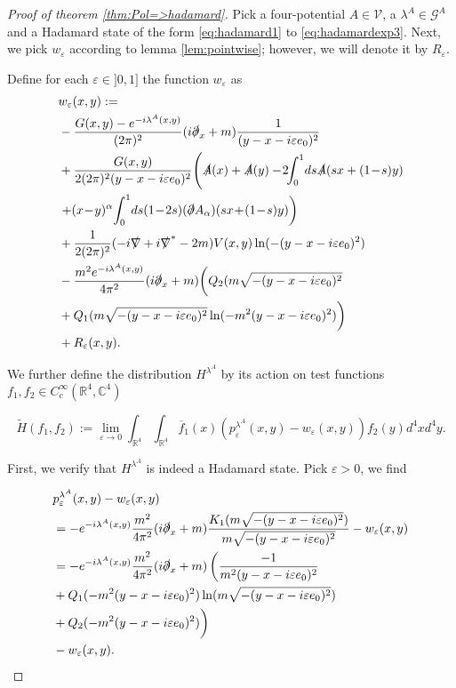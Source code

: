 \documentclass[b5paper,draft,openbib,12pt]{memoir}
\begin{document}
\begin{proof}[Proof of theorem \ref{thm:Pol=>hadamard}]
Pick a four-potential \(A\in \mathcal{V}\),
 a \(\lambda^A\in\mathcal{G}^A\) and
a Hadamard state of the form 
\eqref{eq:hadamard1} to \eqref{eq:hadamardexp3}.
Next, we pick \(w_\varepsilon\) according to lemma 
\ref{lem:pointwise}; however,  
we will denote it by \(R_\varepsilon\).

Define for each \(\varepsilon \in ]0,1]\) the function 
\(w_\varepsilon\) as
\begin{align}
&w_\varepsilon (x,y):=\\
&-\frac{G(x,y)-e^{-i\lambda^A(x,y)}}{(2\pi)^2}(i\slashed{\partial}_x +m) \frac{1}{(y-x-i\varepsilon e_0)^2}\label{wurm A}\\
&+\frac{G(x,y)}{2(2\pi)^2 (y-x-i\varepsilon e_0)^2}\Bigg( \slashed{A}(x)+\slashed{A}(y)
-\!2\!\! \int_0^1 \!ds \slashed{A}(sx +(1\!-\!s)y) \\
&\left. + (x\!-\!y)^\alpha \!\int_0^1\! ds (1\!-\!2s)(\slashed{\partial}A_\alpha)(sx \!+\! (1\!-\!s)y) \right)\\
&+ \frac{1}{2(2\pi)^2} (-i\slashed{\nabla}+i\slashed{\nabla}^* -2m) V(x,y)\ln (-(y-x-i\varepsilon e_0)^2)\\
&-\frac{m^2 e^{-i \lambda^A(x,y)}}{4\pi^2} (i\slashed{\partial}_x+m)\bigg(Q_2(m\sqrt{-(y-x-i\varepsilon e_0)^2}\\
&+Q_1(m\sqrt{-(y-x-i\varepsilon e_0)^2}\ln(-m^2(y-x-i\varepsilon e_0)^2)\bigg)\label{wurm E}\\
& + R_\varepsilon(x,y).
\end{align}

We further define the distribution \(H^{\lambda^A}\) by its action on test functions 
\(f_1,f_2\in C_c^\infty(\mathbb{R}^4,\mathbb{C}^4)\)

\begin{equation}
\tilde{H}(f_1,f_2):=\lim_{\varepsilon \rightarrow 0} \int_{\mathbb{R}^4}\int_{\mathbb{R}^4} \overline{f}_1(x) (p_\varepsilon^{\lambda^A}(x,y)-w_\varepsilon(x,y)) f_2(y) d^4x d^4y.
\end{equation}

First, we verify that \(H^{\lambda^A}\) is indeed a Hadamard state. Pick \(\varepsilon>0\), we find

\begin{align*}
&p_\varepsilon^{\lambda^A}(x,y)-w_\varepsilon(x,y)\\
&=-e^{-i\lambda^A(x,y)}\frac{m^2}{4\pi^2} (i\slashed{\partial}_x+m)
\frac{K_1(m\sqrt{-(y-x-i\varepsilon e_0)^2})}{m\sqrt{-(y-x-i\varepsilon e_0)^2}} - w_\varepsilon(x,y)\\
&=-e^{-i\lambda^A(x,y)}\frac{m^2}{4\pi^2} (i\slashed{\partial}_x+m) \left( \frac{-1}{m^2(y-x-i\varepsilon e_0)^2} \right.\\
&+ Q_1(-m^2 (y-x-i\varepsilon e_0)^2) \ln (m\sqrt{-(y-x-i\varepsilon e_0)^2})\\
&+ Q_2(-m^2 (y-x-i\varepsilon e_0)^2)\bigg)\\
& -w_\varepsilon(x,y).
\end{align*}


\end{proof}
\end{document}

